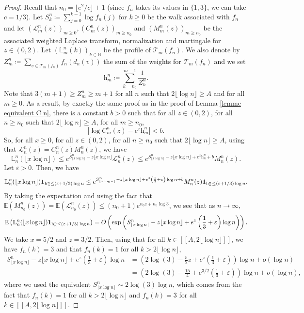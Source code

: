 \documentclass[11pt]{article}
\numberwithin{equation}{section}
\def\vp{\varepsilon}
\def \N{\mathbb{N}}
\def \T{\mathcal{T}}
\def \cL{\mathcal{L}}
\def\E{\mathbb{E}}
\def\lb{[\![}
\def\rb{]\!]}
\begin{document}
\begin{proof}
	Recall that $n_0= \lfloor e^2/c \rfloor +1$ (since $f_n$ takes its values in $\{1,3\}$, we can take $c=1/3$). Let $S^n_k \coloneqq \sum_{j=0}^{k-1} \log f_n(j)$ for $k\ge 0$ be the walk associated with $f_n$ and let $(\cL^n_m(z))_{m\ge 0}, (C^n_m(z))_{m\ge n_0}$ and $(M^n_m(z))_{m\ge n_0}$ be the associated weighted Laplace transform, normalization and martingale for $z \in (0,2)$. Let $(\mathbb{L}^n_m(k))_{k\in \N}$ be the profile of $\T_m(f_n)$. We also denote by $Z^n_m\coloneqq \sum_{v \in \T_m(f_n)} f_n(d_n(v))$ the sum of the weights for $\T_m(f_n)$ and we set
	\begin{equation}\label{eq def h n m}
	\mathrm{h}^n_m \coloneqq \sum_{k=n_0}^{m-1} \frac{1}{Z^n_k}.
	\end{equation}
	Note that $3(m+1)\ge Z^n_m \ge m+1$ for all $n$ such that $2 \lfloor \log n \rfloor \ge A$ and for all $m \ge 0$. As a result, by exactly the same proof as in the proof of Lemma \ref{lemme equivalent C n}, there is a constant $b>0$ such that for all $z \in (0,2)$, for all $n\ge n_0$ such that $2 \lfloor \log n \rfloor\ge A$, for all $m\ge n_0$,
	\[
	\left\vert \log C^n_m(z) -e^z \mathrm{h}^n_m \right\vert <b.
	\]
	So, for all $x \ge 0$, for all $z \in (0,2)$, for all $n\ge n_0$ such that $2 \lfloor \log n \rfloor\ge A$, using that $\cL^n_n(z)= C^n_n(z) M^n_n(z)$, we have
	\[
	\mathbb{L}^n_n(\lfloor x \log n \rfloor) \le e^{S^n_{\lfloor x \log n \rfloor} - z \lfloor x \log n \rfloor} \cL^n_n(z) %
	 \le e^{S^n_{\lfloor x \log n \rfloor} - z \lfloor x \log n \rfloor + e^z \mathrm{h}^n_n + b} M^n_n(z).
	\]
	Let $\vp>0$. Then, we have
	\[
	\mathbb{L}^n_n(\lfloor x \log n \rfloor) {\bf 1}_{\mathrm{h}_n^n \le (\vp+1/3) \log n}
	\le e^{S^n_{\lfloor x \log n \rfloor} - z \lfloor x \log n \rfloor + e^z \left(\frac{1}{3}+ \vp \right) \log n+ b} M^n_n(z) {\bf 1}_{\mathrm{h}_n^n \le (\vp+1/3) \log n}.
	\]
	By taking the expectation and using the fact that $\E(M^n_{n_0}(z)) = \E(\cL^n_{n_0}(z)) \le (n_0+1)e^{n_0 z + n_0 \log 3}$, we see that as $n\to \infty$,
	\[
	\E\left( \mathbb{L}^n_n(\lfloor x \log n \rfloor)  {\bf 1}_{\mathrm{h}_n^n \le (\vp+1/3) \log n}\right) =O \left(
	\exp\left({S^n_{\lfloor x \log n \rfloor} - z \lfloor x \log n \rfloor + e^z \left(\frac{1}{3}+ \vp \right) \log n }\right)  \right).
	\]
	We take $x=5/2$ and $z=3/2$. Then, using that for all $k \in \lb A, 2 \lfloor \log n \rfloor\rb$, we have $f_n(k)=3$ and that $f_n(k) = 1$ for all $k>2 \lfloor \log n \rfloor$,
	\begin{align*}
		S^n_{\lfloor x \log n \rfloor} - z \lfloor x \log n \rfloor + e^z \left(\frac{1}{3} + \vp \right) \log n &= \left( 2\log (3)- \frac{5}{2} z + e^z  \left(\frac{1}{3} + \vp \right) \right)  \log n  + o(\log n)\\
		&=\left( 2\log (3)- \frac{15}{4}  + e^{3/2}  \left(\frac{1}{3} + \vp \right) \right)  \log n  + o(\log n),
	\end{align*}
	where we used the equivalent $S^n_{\lfloor x \log n \rfloor} \sim 2\log(3)\log n$, which comes from the fact that $f_n(k)=1$ for all $k>2 \lfloor \log n \rfloor$ and $f_n(k)=3$ for all $k \in \lb A, 2 \lfloor \log n \rfloor\rb$. 
	

\end{proof}
\end{document}
